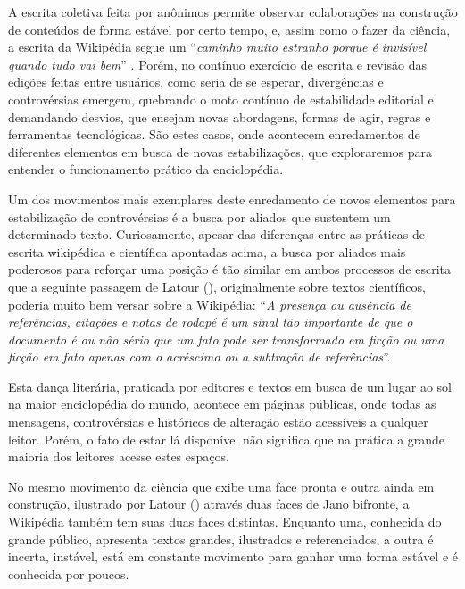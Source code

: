 A escrita coletiva feita por anônimos permite observar colaborações na construção de conteúdos de forma estável por certo tempo, e, assim como o fazer da ciência, a escrita da Wikipédia segue um ``\textit{caminho muito estranho porque é invisível quando tudo vai bem}'' \citep[p.44]{latour_cogitamus_2010}. Porém, no contínuo exercício de escrita e revisão das edições feitas entre usuários, como seria de se esperar, divergências e controvérsias emergem, quebrando o moto contínuo de estabilidade editorial e demandando desvios, que ensejam novas abordagens, formas de agir, regras e ferramentas tecnológicas. São estes casos, onde acontecem enredamentos de diferentes elementos em busca de novas estabilizações, que exploraremos para entender o funcionamento prático da enciclopédia.

Um dos movimentos mais exemplares deste enredamento de novos elementos para estabilização de controvérsias é a busca por aliados que sustentem um determinado texto. Curiosamente, apesar das diferenças entre as práticas de escrita wikipédica e científica apontadas acima, a busca por aliados mais poderosos para reforçar uma posição é tão similar em ambos processos de escrita que a seguinte passagem de Latour (\citeyear[p.48]{latour_cogitamus_2010}), originalmente sobre textos científicos, poderia muito bem versar sobre a Wikipédia: ``\textit{A presença ou ausência de referências, citações e notas de rodapé é um sinal tão importante de que o documento é ou não sério que um fato pode ser transformado em ficção ou uma ficção em fato apenas com o acréscimo ou a subtração de referências}''.

Esta dança literária, praticada por editores e textos em busca de um lugar ao sol na maior enciclopédia do mundo, acontece em páginas públicas, onde todas as mensagens, controvérsias e históricos de alteração estão acessíveis a qualquer leitor. Porém, o fato de estar lá disponível não significa que na prática a grande maioria dos leitores acesse estes espaços.

No mesmo movimento da ciência que exibe uma face pronta e outra ainda em construção, ilustrado por Latour (\citeyear{latour_ciencia_1987}) através duas faces de Jano bifronte, a Wikipédia também tem suas duas faces distintas. Enquanto uma, conhecida do grande público, apresenta textos grandes, ilustrados e referenciados, a outra é incerta, instável, está em constante movimento para ganhar uma forma estável e é conhecida por poucos.

